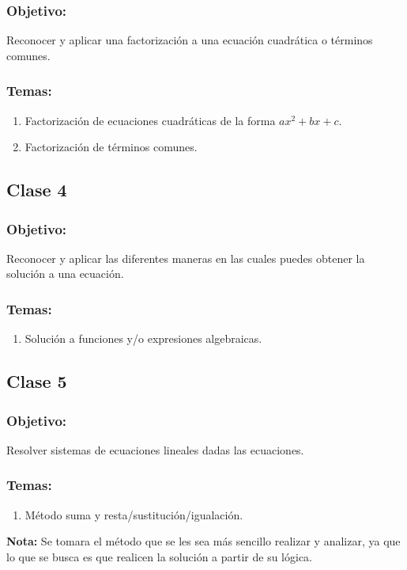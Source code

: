 \documentclass[12pt,letterpaper]{report}
\begin{document}
\subsubsection*{Objetivo:}
Reconocer y aplicar una factorización a una ecuación cuadrática o términos comunes.
\subsubsection*{Temas:}
\begin{enumerate}
    \item Factorización de ecuaciones cuadráticas de la forma $ax^2+bx+c$.
    \item Factorización de términos comunes.
\end{enumerate}
\subsection*{Clase 4}
\subsubsection*{Objetivo:}
Reconocer y aplicar las diferentes maneras en las cuales puedes obtener la solución a una ecuación.
\subsubsection*{Temas:}
\begin{enumerate}
    \item Solución a funciones y/o expresiones algebraicas.
\end{enumerate}
\subsection*{Clase 5}
\subsubsection*{Objetivo:}
Resolver sistemas de ecuaciones lineales dadas las ecuaciones.
\subsubsection*{Temas:}
\begin{enumerate}
    \item Método suma y resta/sustitución/igualación.
\end{enumerate}
\textbf{Nota:} Se tomara el método que se les sea más sencillo realizar y analizar, ya que lo que se busca es que realicen la solución a partir de su lógica. 
\end{document}
